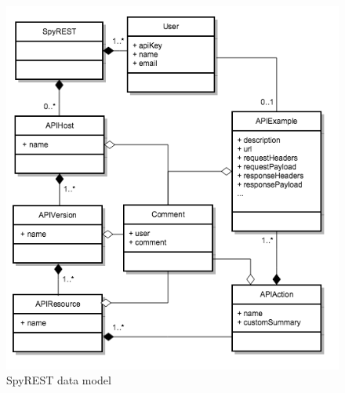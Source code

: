 \documentclass[conference]{IEEEtran}
\begin{document}
\begin{figure}[!tbh]
  \centering
  \includegraphics[width=\linewidth]{data_model.png}
  \caption{SpyREST data model}
  \label{fig:data_model}
\end{figure}
\end{document}
